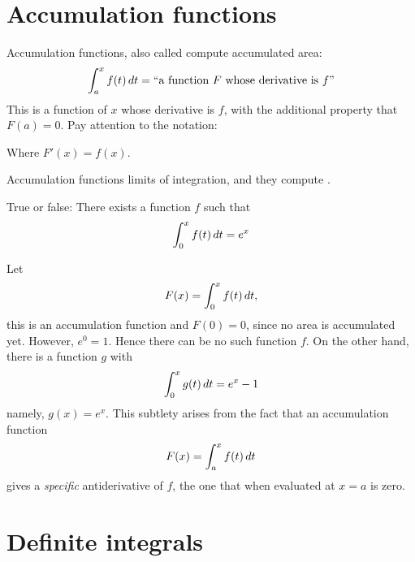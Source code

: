 \documentclass{ximera}
\begin{document}
\section{Accumulation functions}

Accumulation functions, also called  compute accumulated area:
\[
\int_a^x f(t) \,d t = \text{``a function $F$ whose derivative is $f$''}
\]
This is a function of $x$ whose derivative is $f$, with the additional
property that $F(a)=0$.  Pay attention to the notation:
\begin{center}
\end{center}
Where $F'(x) = f(x)$.
\begin{explanation}%
  Accumulation functions  limits of integration, and they compute
  .
\end{explanation}
\begin{question}
  True or false: There exists a function $f$ such that 
  \[
  \int_0^x f(t) \,d t = e^x
  \]
  \begin{multipleChoice}
  \end{multipleChoice}
  \begin{feedback}
    Let
    \[
    F(x) = \int_0^x f(t) \,d t,
    \]
    this is an accumulation function and $F(0) = 0$, since no area is
    accumulated yet. However, $e^0 =1$. Hence there can be no such
    function $f$. On the other hand, there is a function $g$ with
     \[
     \int_0^x g(t) \,d t = e^x-1
     \]
     namely, $g(x) = e^x$. This subtlety arises from the fact that an
     accumulation function
     \[
     F(x) = \int_a^x f(t) \,d t
     \]
     gives a \textit{specific} antiderivative of $f$, the one that
     when evaluated at $x=a$ is zero.
  \end{feedback}
\end{question}










\section{Definite integrals}
\end{document}
